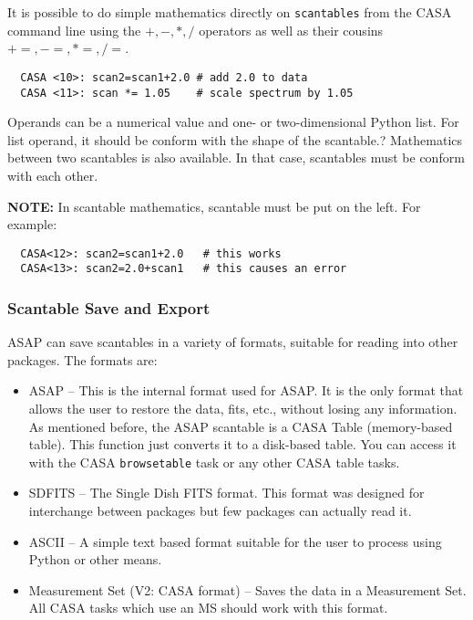 It is possible to do simple mathematics directly on {\tt scantables}
from the CASA command line using the $+,-,*,/$ operators as well as
their cousins $+=, -=, *=, /=$.  

\small
\begin{verbatim}
  CASA <10>: scan2=scan1+2.0 # add 2.0 to data 
  CASA <11>: scan *= 1.05    # scale spectrum by 1.05 
\end{verbatim}
\normalsize

Operands can be
a numerical value and one- or two-dimensional Python list. For list
operand, it should be conform with the shape of the scantable.?
Mathematics between two scantables is also available. In that case,
scantables must be conform with each other.

{\bf NOTE:} In scantable mathematics, scantable must be put on the left.
For example:
\begin{verbatim}
  CASA<12>: scan2=scan1+2.0   # this works
  CASA<13>: scan2=2.0+scan1   # this causes an error
\end{verbatim}


\subsubsection{Scantable Save and Export}
\label{subsubsection:sd.asap.scantable.export}

ASAP can save scantables in a variety of formats, suitable for reading
into other packages. The formats are: 

\begin{itemize}
    \item ASAP -- This is the internal format used for ASAP. It is the only
     format that allows the user to restore the data, fits, etc.,
     without losing any information. As mentioned before, the ASAP
     scantable is a CASA Table (memory-based table). This function
     just converts it to a disk-based table. You can access it with
     the CASA {\tt browsetable} task or any other CASA table tasks. 

   \item SDFITS -- The Single Dish FITS format. This format was designed
     for interchange between packages but few packages can actually
     read it. 

   \item ASCII -- A simple text based format suitable for the user to
     process using Python or other means. 

   \item Measurement Set (V2: CASA format) -- Saves the data in a
     Measurement Set. All CASA tasks which use an MS should work with this format.
\end{itemize}

